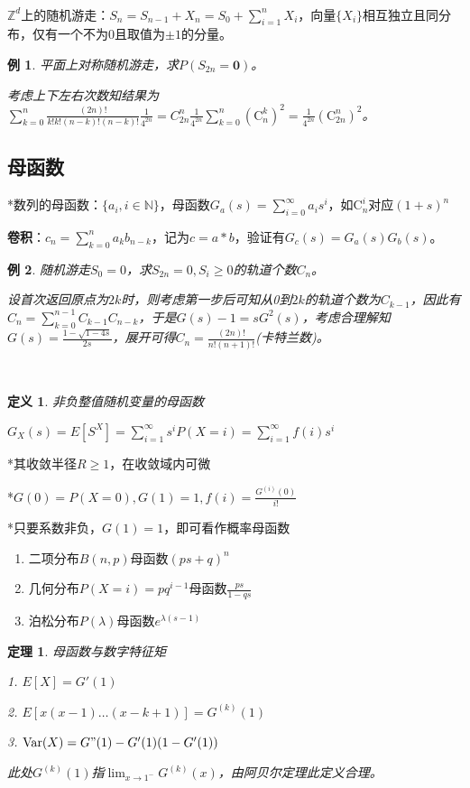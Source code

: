 \documentclass[a4paper,UTF8,fontset=windows]{ctexart}
\newtheorem{thm}{定理}[section]
\newtheorem{exmp}{例}[section]
\newtheorem{defi}{定义}[section]
\DeclareMathOperator{\Var}{Var}
\begin{document}
~

$\mathbb{Z}^d$上的随机游走：$S_n=S_{n-1}+X_n=S_0+\sum_{i=1}^nX_i$，向量$\{X_i\}$相互独立且同分布，仅有一个不为0且取值为$\pm1$的分量。

\begin{exmp} 平面上对称随机游走，求$P(S_{2n}=\mathbf{0})$。

考虑上下左右次数知结果为$\sum_{k=0}^n\frac{(2n)!}{k!k!(n-k)!(n-k)!}\frac{1}{4^{2n}}=C_{2n}^n\frac{1}{4^{2n}}\sum_{k=0}^n(\mathrm{C}_n^k)^2=\frac{1}{4^{2n}}(\mathrm{C}_{2n}^n)^2$。
\end{exmp}

\subsection{母函数}
*数列的母函数：$\{a_i,i\in\mathbb{N}\}$，母函数$G_a(s)=\sum_{i=0}^\infty a_is^i$，如$\mathrm{C}_n^i$对应$(1+s)^n$

\textbf{卷积}：$c_n=\sum_{k=0}^na_kb_{n-k}$，记为$c=a*b$，验证有$G_c(s)=G_a(s)G_b(s)$。

\begin{exmp} 随机游走$S_0=0$，求$S_{2n}=0,S_i\ge0$的轨道个数$C_n$。

设首次返回原点为$2k$时，则考虑第一步后可知从0到$2k$的轨道个数为$C_{k-1}$，因此有$C_n=\sum_{k=0}^{n-1}C_{k-1}C_{n-k}$，于是$G(s)-1=sG^2(s)$，考虑合理解知$G(s)=\frac{1-\sqrt{1-4s}}{2s}$，展开可得$C_n=\frac{(2n)!}{n!(n+1)!}$(\emph{卡特兰}数)。
\end{exmp}

~

\begin{defi} 非负整值随机变量的母函数

$G_X(s)=E[S^X]=\sum_{i=1}^\infty s^iP(X=i)=\sum_{i=1}^\infty f(i)s^i$
\end{defi}

*其收敛半径$R\ge1$，在收敛域内可微

*$G(0)=P(X=0),G(1)=1,f(i)=\frac{G^{(i)}(0)}{i!}$

*只要系数非负，$G(1)=1$，即可看作概率母函数

\begin{enumerate}
	\item 二项分布$B(n,p)$母函数$(ps+q)^n$
	\item 几何分布$P(X=i)=pq^{i-1}$母函数$\frac{ps}{1-qs}$
	\item 泊松分布$P(\lambda)$母函数$e^{\lambda(s-1)}$
\end{enumerate}

\begin{thm} 母函数与数字特征矩

1. $E[X]=G'(1)$

2. $E[x(x-1)\dots(x-k+1)]=G^{(k)}(1)$

3. $\Var(X)=G"(1)-G'(1)(1-G'(1))$

此处$G^{(k)}(1)$指$\lim_{x\to1^-}G^{(k)}(x)$，由阿贝尔定理此定义合理。
\end{thm}
\end{document}
